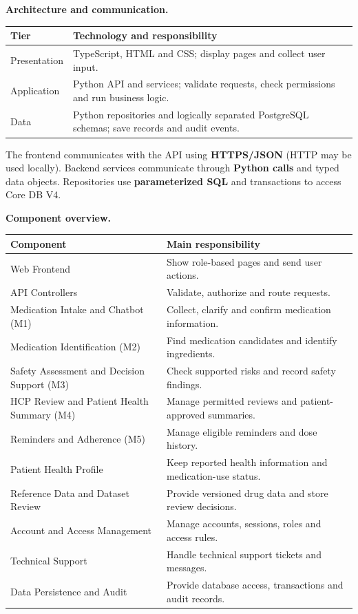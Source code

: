 \documentclass[10pt,letterpaper]{article}
\newcommand{\upd}[1]{{\color{pafourblue}#1}}
\renewcommand{\arraystretch}{1.23}
\begin{document}
\noindent\textbf{Architecture and communication.}\par\smallskip
\begingroup\small
\begin{tabularx}{\textwidth}{|L{0.24\textwidth}|Y|}
\hline
\textbf{Tier} & \textbf{Technology and responsibility} \\ \hline
Presentation & TypeScript, HTML and CSS; display pages and collect user input. \\ \hline
Application & Python API and services; validate requests, check permissions and run business logic. \\ \hline
Data & \upd{Python repositories and logically separated PostgreSQL schemas; save records and audit events.} \\ \hline
\end{tabularx}
\endgroup

The frontend communicates with the API using \textbf{HTTPS/JSON} (HTTP may be
used locally). Backend services communicate through \textbf{Python calls}
and typed data objects. Repositories use \textbf{parameterized SQL} and
transactions to access Core DB V4.

\noindent\textbf{Component overview.}\par\smallskip
\begingroup\small\renewcommand{\arraystretch}{1.08}
\begin{tabularx}{\textwidth}{|L{0.43\textwidth}|Y|}
\hline
\textbf{Component} & \textbf{Main responsibility} \\ \hline
Web Frontend & Show role-based pages and send user actions. \\ \hline
API Controllers & Validate, authorize and route requests. \\ \hline
Medication Intake and Chatbot (M1) & Collect, clarify and confirm medication information. \\ \hline
Medication Identification (M2) & Find medication candidates and identify ingredients. \\ \hline
Safety Assessment and Decision Support (M3) & Check supported risks and record safety findings. \\ \hline
HCP Review and Patient Health Summary (M4) & Manage permitted reviews and patient-approved summaries. \\ \hline
Reminders and Adherence (M5) & Manage eligible reminders and dose history. \\ \hline
Patient Health Profile & Keep reported health information and medication-use status. \\ \hline
Reference Data and Dataset Review & Provide versioned drug data and store review decisions. \\ \hline
Account and Access Management & Manage accounts, sessions, roles and access rules. \\ \hline
Technical Support & Handle technical support tickets and messages. \\ \hline
Data Persistence and Audit & Provide database access, transactions and audit records. \\ \hline
\end{tabularx}
\endgroup
\end{document}
